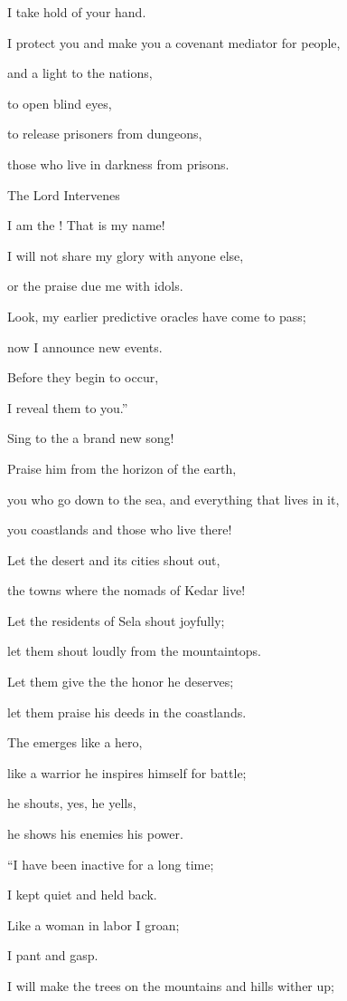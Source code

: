 {\par }{\Q I take hold
of your hand.
\par }{\Q I protect
you and make
you a covenant
mediator for people,
\par }{\Q and a light
to the nations,
\par }{\Q {}to open
blind
eyes,
\par }{\Q to release
prisoners
from dungeons,
\par }{\Q those who live
in darkness
from prisons.
\par }{\SH The Lord Intervenes
\par }{\Q {}I am
the {}! That is
my name!
\par }{\Q I will not share my glory
with anyone else,
\par }{\Q or the praise
due me with idols.
\par }{\Q {}Look,
my earlier
predictive oracles have come
to pass;

\par }{\Q now I
announce
new
events.
\par }{\Q Before
they begin to occur,
\par }{\Q I reveal them to you.”
\par }{\Q {}Sing
to the
{}
a brand new
song!
\par }{\Q Praise
him from the horizon
of the earth,
\par }{\Q you who go down
to the sea,
and everything
that lives in it,

\par }{\Q you coastlands
and those who live there!
\par }{\Q {}Let the desert
and its cities
shout out,
\par }{\Q the towns
where the nomads of Kedar
live!
\par }{\Q Let the residents
of Sela
shout joyfully;
\par }{\Q let them shout loudly
from the mountaintops.
\par }{\Q {}Let them give
the {}
the honor
he deserves;

\par }{\Q let them praise
his deeds in the coastlands.
\par }{\Q {}The
{}
emerges like
a hero,
\par }{\Q like
a warrior
he inspires himself for battle;
\par }{\Q he shouts, yes,
he yells,
\par }{\Q he shows his enemies
his power.
\par }{\Q {}“I have been inactive
for a long time;
\par }{\Q I kept quiet
and held back.
\par }{\Q Like a woman in labor
I groan;
\par }{\Q I pant
and gasp.
\par }{\Q {}I will make the trees on the mountains
and hills
wither
up;

}

